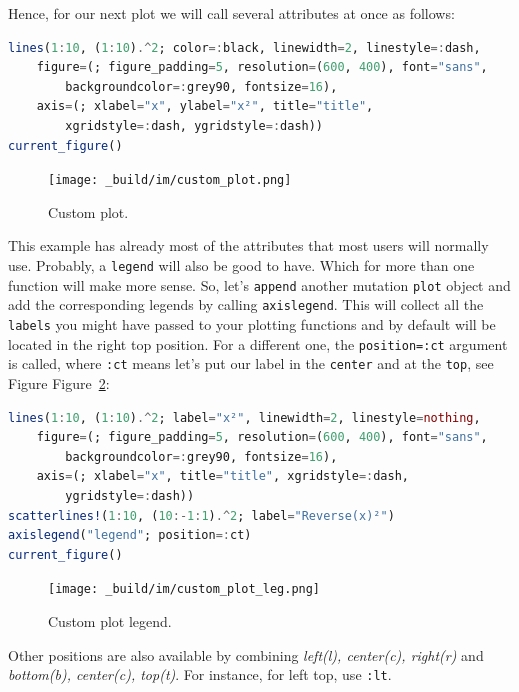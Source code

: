 \documentclass[
  notoc %
]{tufte-book}
\newcommand{\passthrough}[1]{#1}
\begin{document}
Hence, for our next plot we will call several attributes at once as
follows:

\begin{lstlisting}[language=Julia]
lines(1:10, (1:10).^2; color=:black, linewidth=2, linestyle=:dash,
    figure=(; figure_padding=5, resolution=(600, 400), font="sans",
        backgroundcolor=:grey90, fontsize=16),
    axis=(; xlabel="x", ylabel="x²", title="title",
        xgridstyle=:dash, ygridstyle=:dash))
current_figure()
\end{lstlisting}

\begin{figure}
\hypertarget{fig:custom_plot}{%
\centering
\texttt{[image: \_build/im/custom\_plot.png]}
\caption{Custom plot.}\label{fig:custom_plot}
}
\end{figure}

This example has already most of the attributes that most users will
normally use. Probably, a \passthrough{\lstinline!legend!} will also be
good to have. Which for more than one function will make more sense. So,
let's \passthrough{\lstinline!append!} another mutation
\passthrough{\lstinline!plot!} object and add the corresponding legends
by calling \passthrough{\lstinline!axislegend!}. This will collect all
the \passthrough{\lstinline!labels!} you might have passed to your
plotting functions and by default will be located in the right top
position. For a different one, the
\passthrough{\lstinline!position=:ct!} argument is called, where
\passthrough{\lstinline!:ct!} means let's put our label in the
\passthrough{\lstinline!center!} and at the
\passthrough{\lstinline!top!}, see Figure
Figure~\ref{fig:custom_plot_leg}:

\begin{lstlisting}[language=Julia]
lines(1:10, (1:10).^2; label="x²", linewidth=2, linestyle=nothing,
    figure=(; figure_padding=5, resolution=(600, 400), font="sans",
        backgroundcolor=:grey90, fontsize=16),
    axis=(; xlabel="x", title="title", xgridstyle=:dash,
        ygridstyle=:dash))
scatterlines!(1:10, (10:-1:1).^2; label="Reverse(x)²")
axislegend("legend"; position=:ct)
current_figure()
\end{lstlisting}

\begin{figure}
\hypertarget{fig:custom_plot_leg}{%
\centering
\texttt{[image: \_build/im/custom\_plot\_leg.png]}
\caption{Custom plot legend.}\label{fig:custom_plot_leg}
}
\end{figure}

Other positions are also available by combining \emph{left(l),
center(c), right(r)} and \emph{bottom(b), center(c), top(t)}. For
instance, for left top, use \passthrough{\lstinline!:lt!}.
\end{document}
